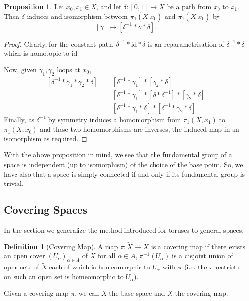 \documentclass[]{article}
\theoremstyle{definition}
\theoremstyle{definition}
\newtheorem{definition}{Definition}[section]
\newtheorem{proposition}{Proposition}[section]
\begin{document}
\begin{proposition}
  Let \(x_0, x_1 \in X\), and let \(\delta : [0, 1] \to X\) be a path from \(x_0\) 
  to \(x_1\). Then \(\delta\) induces and isomorphism between \(\pi_1(X_, x_0)\) 
  and \(\pi_1(X_, x_1)\) by 
  \[[\gamma] \mapsto [\delta^{-1} * \gamma * \delta].\]
\end{proposition}
\begin{proof}
  Clearly, for the constant path, \(\delta^{-1} * \text{id} * \delta\) is an 
  reparametrisation of \(\delta^{-1} * \delta\) which is homotopic to \(\text{id}\).
  
  Now, given \(\gamma_1, \gamma_2\) loops at \(x_0\), 
  \[\begin{split}
    [\delta^{-1} * \gamma_1 * \gamma_2 * \delta] & = [\delta^{-1} * \gamma_1] * [\gamma_2 * \delta] \\
    & = [\delta^{-1} * \gamma_1] * [\delta * \delta^{-1}] * [\gamma_2 * \delta]  \\
    & = [\delta^{-1} * \gamma_1 * \delta] * [\delta^{-1} * \gamma_2 * \delta].
  \end{split}\]
  Finally, as \(\delta^{-1}\) by symmetry induces a homomorphism from \(\pi_1(X, x_1)\) 
  to \(\pi_1(X, x_0)\) and these two homomorphisms are inverses, the induced map
  in an isomorphism as required.
\end{proof}

With the above proposition in mind, we see that the fundamental group of a space is 
independent (up to isomorphism) of the choice of the base point. So, we have also 
that a space is simply connected if and only if its fundamental group is trivial.

\subsection{Covering Spaces}

In the section we generalize the method introduced for toruses to general spaces.

\begin{definition}[Covering Map]
  A map \(\pi : \tilde X \to X\) is a covering map if there exists an open cover 
  \((U_\alpha)_{\alpha \in A}\) of \(X\) for all \(\alpha \in A\), \(\pi^{-1}(U_\alpha)\) 
  is a disjoint union of open sets of \(\tilde X\) each of which is homeomorphic to 
  \(U_\alpha\) with \(\pi\) (i.e. the \(\pi\) restricts on such an open set is 
  homeomorphic to \(U_\alpha\)).

  Given a covering map \(\pi\), we call \(X\) the base space and \(\tilde X\) the 
  covering map.
\end{definition}
\end{document}
